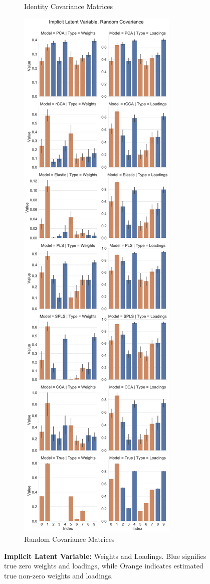 \begin{figure}
\begin{subfigure}{0.49\linewidth}
        \caption{Identity Covariance Matrices}
    \end{subfigure}
    \begin{subfigure}{0.49\linewidth}
        \centering
        \includegraphics[width=\linewidth]{figures/simulated/low/Combined_Weights_Loadings_with_Error_Bars_Random_Covariance_implicit}
        \caption{Random Covariance Matrices}
    \end{subfigure}
    \caption{\textbf{Implicit Latent Variable:} Weights and Loadings. Blue signifies true zero weights and loadings, while Orange indicates estimated true non-zero weights and loadings.}\label{fig:implicit-latent-variable-weights-loadings}
\end{figure}



